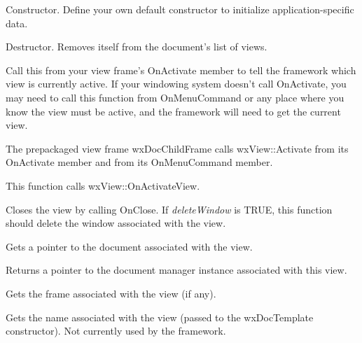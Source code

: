

Constructor. Define your own default constructor to initialize application-specific
data.



Destructor. Removes itself from the document's list of views.



Call this from your view frame's OnActivate member to tell the framework which view is
currently active. If your windowing system doesn't call OnActivate, you may need to
call this function from OnMenuCommand or any place where you know the view must
be active, and the framework will need to get the current view.

The prepackaged view frame wxDocChildFrame calls wxView::Activate from its OnActivate member
and from its OnMenuCommand member.

This function calls wxView::OnActivateView.



Closes the view by calling OnClose. If {\it deleteWindow} is TRUE, this function should
delete the window associated with the view.



Gets a pointer to the document associated with the view.



Returns a pointer to the document manager instance associated with this view.



Gets the frame associated with the view (if any).



Gets the name associated with the view (passed to the wxDocTemplate constructor).
Not currently used by the framework.

